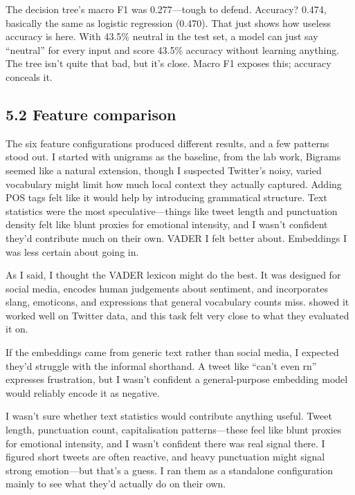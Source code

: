 \documentclass[12pt]{article}
\begin{document}
The decision tree's macro F1 was 0.277---tough to defend. Accuracy? 0.474, basically the same as logistic regression (0.470). That just shows how useless accuracy is here. With 43.5\% neutral in the test set, a model can just say ``neutral'' for every input and score 43.5\% accuracy without learning anything. The tree isn't quite that bad, but it's close. Macro F1 exposes this; accuracy conceals it.



\subsection*{5.2 Feature comparison}



The six feature configurations produced different results, and a few patterns stood out.
I started with unigrams as the baseline, from the lab work, Bigrams seemed like a natural extension, 
though I suspected Twitter's noisy, varied vocabulary might limit how much local context they actually captured.
Adding POS tags felt like it would help by introducing  grammatical structure.
Text statistics were the most speculative---things like tweet length and punctuation density felt like blunt proxies for emotional intensity,
 and I wasn't confident they'd contribute much on their own.
VADER I felt better about.
Embeddings I was less certain about going in.

As I said, I thought the VADER lexicon might do the best.
It was designed for social media, encodes human judgements about sentiment, and incorporates slang, emoticons, and expressions that general vocabulary counts miss.
\citet{hutto2014vader} showed it worked well on Twitter data, and this task felt very close to what they evaluated it on.


If the embeddings came from generic text rather than social media, I expected they'd struggle with the informal shorthand.
A tweet like ``can't even rn'' expresses frustration, but I wasn't confident a general-purpose embedding model would reliably encode it as negative.

I wasn't sure whether text statistics would contribute anything useful.
Tweet length, punctuation count, capitalisation patterns---these feel like blunt proxies for emotional intensity, and I wasn't confident there was real signal there.
I figured short tweets are often reactive, and heavy punctuation might signal strong emotion---but that's a guess.
I ran them as a standalone configuration mainly to see what they'd actually do on their own.
\end{document}

